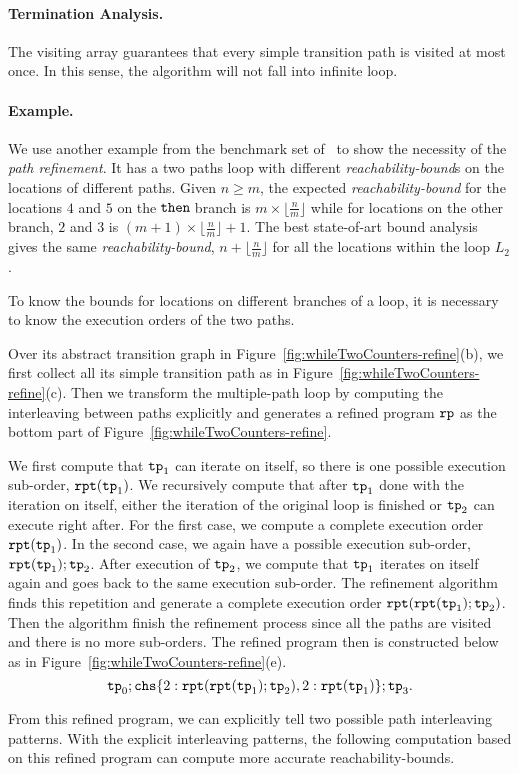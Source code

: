 \paragraph{Termination Analysis.}
The visiting array guarantees that every simple transition path is visited at most once.
In this sense, the algorithm will not fall into infinite loop.


\paragraph{Example.}
We use another example from the benchmark set of~\cite{GulwaniJK09} to show the necessity of the \emph{path refinement}. 
It has a two paths loop
with different \emph{reachability-bound}s on the locations of different paths.
%
Given $n \geq m$,
the expected \emph{reachability-bound} for the locations $4$ and $5$ on the$\mathtt{\;then\;}$branch is $m \times \lfloor\frac{n}{m}\rfloor$
while for locations on the other branch, $2$ and $3$ is $(m + 1) \times \lfloor\frac{n}{m}\rfloor + 1$. 
The best state-of-art bound analysis
gives the same \emph{reachability-bound}, $n + \lfloor\frac{n}{m}\rfloor$ for all the locations within the loop $L_2$.

To know the bounds for locations on different branches of a loop, 
it is necessary to know the execution orders of the two paths.

Over its abstract transition graph in Figure~\ref{fig:whileTwoCounters-refine}(b), we first collect all its simple transition path as in Figure~\ref{fig:whileTwoCounters-refine}(c).
Then we transform the multiple-path loop by computing the interleaving between paths explicitly and
generates a refined program $\mathtt{rp}$ as the bottom part of Figure~\ref{fig:whileTwoCounters-refine}.

We first compute that $\mathtt{tp}_1$ can iterate on itself, so there is one possible execution sub-order,
$\mathtt{rpt}(\mathtt{tp}_1)$.
We recursively compute that after $\mathtt{tp}_1$ done with the iteration on itself,
either the iteration of the original loop is finished
or $\mathtt{tp}_2$ can execute right after.
For the first case, we compute a complete execution order $\mathtt{rpt}(\mathtt{tp}_1)$.
In the second case, we again have a possible execution sub-order, $\mathtt{rpt}(\mathtt{tp}_1); \mathtt{tp}_2$.
After execution of $\mathtt{tp}_2$, we compute that $\mathtt{tp}_1$ iterates on itself again
and goes back to the same execution sub-order. 
The refinement algorithm finds this repetition and generate a complete execution order
$\mathtt{rpt}(\mathtt{rpt}(\mathtt{tp}_1); \mathtt{tp}_2)$.
Then the algorithm finish the refinement process since all the paths are visited and there is no more sub-orders. 
The refined program then is constructed below as in Figure~\ref{fig:whileTwoCounters-refine}(e).
\[
   \tpath_0 ; 
   \rpchoose{2: \rprepeat(\rprepeat(\tpath_1); \tpath_2), 
   2: \rprepeat(\tpath_1)}; \tpath_3.
\]

From this refined program, we can explicitly tell two possible path interleaving patterns.
With the explicit interleaving patterns, the following computation based on this refined program can compute more accurate reachability-bounds.
